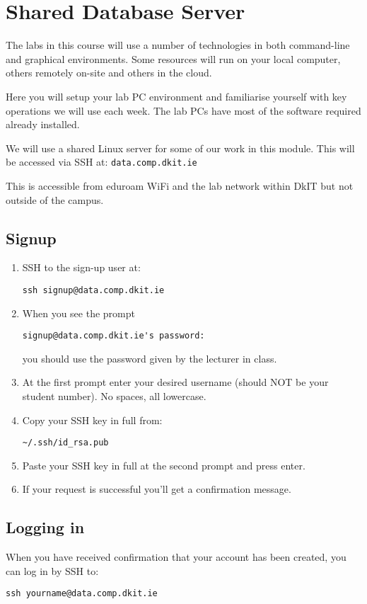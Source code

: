 \chapter{Shared Database Server}


The labs in this course will use a number of technologies in both command-line and graphical environments.
Some resources will run on your local computer, others remotely on-site and others in the cloud.

Here you will setup your lab PC environment and familiarise yourself with key operations we will use each week.
The lab PCs have most of the software required already installed.


We will use a shared Linux server for some of our work in this module.
This will be accessed via SSH at:
\texttt{data.comp.dkit.ie}

This is accessible from eduroam WiFi and the lab network within DkIT but not outside of the campus.

\section{Signup}

\begin{enumerate}

\item SSH to the sign-up user at:
\begin{verbatim}
ssh signup@data.comp.dkit.ie
\end{verbatim}

\item When you see the prompt
\begin{verbatim}
signup@data.comp.dkit.ie's password: 
\end{verbatim}
  you should use the password given by the lecturer in class.

\item At the first prompt enter your desired username (should NOT be your student number).
  No spaces, all lowercase.

\item Copy your SSH key in full from:
\begin{verbatim}
~/.ssh/id_rsa.pub
\end{verbatim}
  
\item Paste your SSH key in full at the second prompt and press enter.

\item If your request is successful you'll get a confirmation message.
  
\end{enumerate}

\section{Logging in}

When you have received confirmation that your account has been created, you can log in by SSH to:
\begin{verbatim}
ssh yourname@data.comp.dkit.ie
\end{verbatim}
